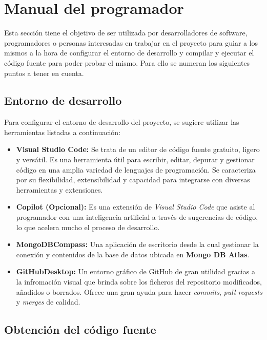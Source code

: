 \section{Manual del programador}

Esta sección tiene el objetivo de ser utilizada por desarrolladores de software, programadores o personas interesadas en trabajar en el proyecto para guiar a los mismos a la hora de configurar el entorno de desarrollo y compilar y ejecutar el código fuente para poder probar el mismo. Para ello se numeran los siguientes puntos a tener en cuenta.

\subsection{Entorno de desarrollo}

Para configurar el entorno de desarrollo del proyecto, se sugiere utilizar las herramientas listadas a continuación:

\begin{itemize}
	\item \textbf{Visual Studio Code:} Se trata de un editor de código fuente gratuito, ligero y versátil. Es una herramienta útil para escribir, editar, depurar y gestionar código en una amplia variedad de lenguajes de programación. Se caracteriza por su flexibilidad, extensibilidad y capacidad para integrarse con diversas herramientas y extensiones. 
	\item \textbf{Copilot (Opcional):} Es una extensión de \textit{Visual Studio Code} que asiste al programador con una inteligencia artificial a través de sugerencias de código, lo que acelera mucho el proceso de desarrollo.
	\item \textbf{MongoDBCompass:} Una aplicación de escritorio desde la cual gestionar la conexión y contenidos de la base de datos ubicada en \textbf{Mongo DB Atlas}.
    \item \textbf{GitHubDesktop:} Un entorno gráfico de GitHub de gran utilidad gracias a la infromación visual que brinda sobre los ficheros del repositorio modificados, añadidos o borrados. Ofrece una gran ayuda para hacer \textit{commits}, \textit{pull requests} y \textit{merges} de calidad.
\end{itemize}

\subsection{Obtención del código fuente}

